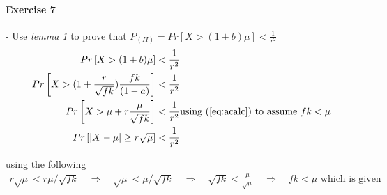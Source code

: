 \paragraph{Exercise 7} - Use \textit{lemma 1} to prove that $P_{(II)} = Pr\left[ X > (1+b)\mu \right] < \frac{1}{r^2}$
\begin{align}
  Pr\left[  X > (1+b)\mu  \right] &< \frac{1}{r^2} \\
  Pr\left[  X > (1+ \frac{r}{\sqrt{fk}}) \frac{fk}{(1-a)} \right] &< \frac{1}{r^2} \\
  Pr\left[  X > \mu + r \frac{\mu}{\sqrt{fk}}  \right] &< \frac{1}{r^2} \text{using (\ref{eq:acalc}) to assume } fk < \mu \\
  Pr \left[ |X - \mu| \geq r \sqrt{\mu} \right] &< \frac{1}{r^2}
\end{align}

using the following
\begin{align}
  r \sqrt{\mu} < r \mu / \sqrt{fk}
  \quad \Rightarrow \quad  \sqrt{\mu} < \mu / \sqrt{fk}
  \quad \Rightarrow \quad  \sqrt{fk} < \frac{\mu}{\sqrt{\mu}}
  \quad \Rightarrow \quad  fk < \mu \text{ which is given } \label{eq:acalc}
\end{align}


